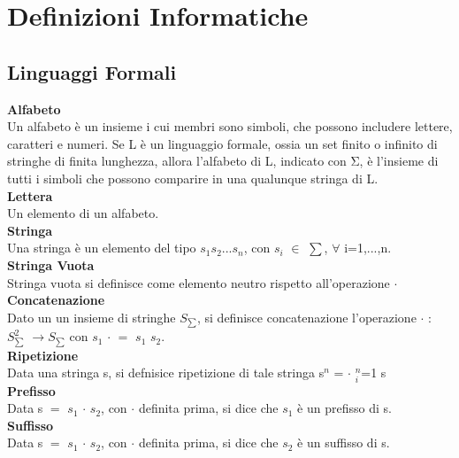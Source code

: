 \documentclass{article}
\begin{document}
\section{Definizioni Informatiche}
\subsection{Linguaggi Formali}
\textbf{Alfabeto}\\
Un alfabeto è un insieme i cui membri sono simboli, che possono includere lettere, caratteri e numeri.
Se L è un linguaggio formale, ossia un set finito o infinito di stringhe di finita lunghezza, allora l’alfabeto di L, indicato con Σ, è l’insieme di tutti i simboli che possono comparire in una qualunque stringa di L.
\\
\textbf{Lettera}\\
Un elemento di un alfabeto.
\\
\textbf{Stringa}\\
Una stringa è un elemento del tipo $s_1s_2$...$s_n$, con $s_i$ $\in$ $\sum$, $\forall$ i=1,...,n.
\\
\textbf{Stringa Vuota}\\
Stringa vuota si definisce come elemento neutro rispetto all'operazione $\cdot$
\\
\textbf{Concatenazione}\\
Dato un un insieme di stringhe $S_\sum$, si definisce concatenazione l'operazione $\cdot$ : $S^2_\sum$
$\rightarrow S_\sum$ con $s_1$ $\cdot$ $=$ $s_1$ $s_2$.
\\
\textbf{Ripetizione}
\\Data una stringa s, si defnisice ripetizione di tale stringa s$^n$ = $\cdot$ $^n_i$=1 s
\\
\textbf{Prefisso}
\\
Data s $=$ $s_1$ $\cdot$ $s_2$, con $\cdot$ definita prima, si dice che $s_1$ è un prefisso di s.
\\
\textbf{Suffisso}
\\
Data s $=$ $s_1$ $\cdot$ $s_2$, con $\cdot$ definita prima, si dice che $s_2$ è un suffisso di s.
\end{document}

